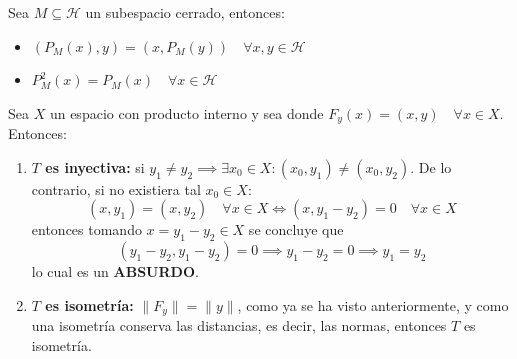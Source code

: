 \begin{ejercicio}
    Sea $M \subseteq \mathcal{H}$ un subespacio cerrado, entonces:
    \begin{itemize}
        \item[i)] $(P_M(x), y) = (x, P_M(y)) \quad \forall x, y \in \mathcal{H}$
        \item[ii)] $P_M^2(x) = P_M(x) \quad \forall x \in \mathcal{H}$
    \end{itemize}
\end{ejercicio}

\begin{observacion}
    Sea $X$ un espacio con producto interno y sea 
    donde $F_y(x) = (x, y) \quad \forall x \in X$. Entonces:

    \begin{enumerate}
        \item \textbf{$T$ es inyectiva:} si $y_1 \neq y_2 \implies \exists x_0 \in X : (x_0, y_1) \neq (x_0, y_2)$. 
        De lo contrario, si no existiera tal $x_0 \in X$:
        \[ (x, y_1) = (x, y_2) \quad \forall x \in X \iff (x, y_1 - y_2) = 0 \quad \forall x \in X  \]
        entonces tomando $x=y_1 - y_2\in X$ se concluye que 
        $$(y_1 - y_2, y_1 - y_2) = 0 \implies y_1 - y_2 = 0 \implies y_1 = y_2$$
        lo cual es un \textbf{ABSURDO}.
        
        \item \textbf{$T$ es isometría:} $\|F_y\| = \|y\|$, como ya se ha visto anteriormente, y como una isometría conserva las distancias, es decir, las normas, entonces $T$ es isometría.
    \end{enumerate}
\end{observacion}


